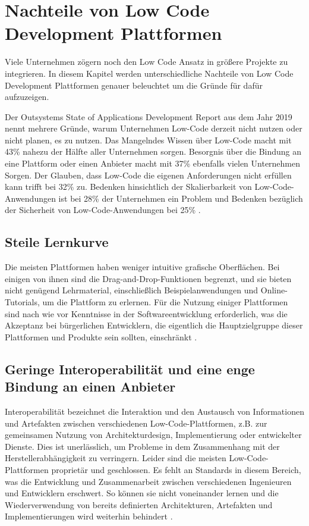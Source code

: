 \documentclass[12pt]{article} %
\begin{document}
	
	\section{Nachteile von Low Code Development Plattformen} \label{Nachteile}
	Viele Unternehmen zögern noch den Low Code Ansatz in größere Projekte zu integrieren. In diesem Kapitel werden unterschiedliche Nachteile von Low Code Development Plattformen genauer beleuchtet um die Gründe für dafür aufzuzeigen. \newline
	
	Der Outsystems State of Applications Development Report aus dem Jahr 2019 nennt mehrere Gründe, warum Unternehmen Low-Code derzeit nicht nutzen oder nicht planen, es zu nutzen. Das Mangelndes Wissen über Low-Code macht mit 43\% nahezu der Hälfte aller Unternehmen sorgen. Besorgnis über die Bindung an eine Plattform oder einen Anbieter macht mit 37\% ebenfalls vielen Unternehmen Sorgen. Der Glauben, dass Low-Code die eigenen Anforderungen nicht erfüllen kann trifft bei 32\% zu. Bedenken hinsichtlich der Skalierbarkeit von Low-Code-Anwendungen ist bei 28\% der Unternehmen ein Problem und Bedenken bezüglich der Sicherheit von Low-Code-Anwendungen bei 25\% \autocite{KevinShuler.2023}.
			
	\subsection{Steile Lernkurve}
	Die meisten Plattformen haben weniger intuitive grafische Oberflächen. Bei einigen von ihnen sind die Drag-and-Drop-Funktionen begrenzt, und sie bieten nicht genügend Lehrmaterial, einschließlich Beispielanwendungen und Online-Tutorials, um die Plattform zu erlernen. 
	Für die Nutzung einiger Plattformen sind nach wie vor Kenntnisse in der Softwareentwicklung erforderlich, was die Akzeptanz bei bürgerlichen Entwicklern, die eigentlich die Hauptzielgruppe dieser Plattformen und Produkte sein sollten, einschränkt \autocite{Alamin.2023}.
	
	\subsection{Geringe Interoperabilität und eine enge Bindung an einen Anbieter}
	Interoperabilität bezeichnet die Interaktion und den Austausch von Informationen und Artefakten zwischen verschiedenen Low-Code-Plattformen, z.B. zur gemeinsamen Nutzung von Architekturdesign, Implementierung oder entwickelter Dienste. Dies ist unerlässlich, um Probleme in dem Zusammenhang mit der Herstellerabhängigkeit zu verringern. Leider sind die meisten Low-Code-Plattformen proprietär und geschlossen. Es fehlt an Standards in diesem Bereich, was die Entwicklung und Zusammenarbeit zwischen verschiedenen Ingenieuren und Entwicklern erschwert. So können sie nicht voneinander lernen und die Wiederverwendung von bereits definierten Architekturen, Artefakten und Implementierungen wird weiterhin behindert \autocite{Alamin.2023}.  
	
\end{document}
